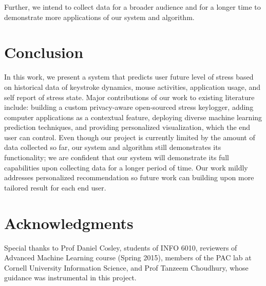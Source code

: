 \documentclass{article}
\begin{document}
Further, we intend to collect data for a broader audience and for a longer time to demonstrate more applications of our system and algorithm. 

\section{Conclusion}
In this work, we present a system that predicts user future level of stress based on historical data of keystroke dynamics, mouse activities, application usage, and self report of stress state. Major contributions of our work to existing literature include: building a custom privacy-aware open-sourced stress keylogger, adding computer applications as a contextual feature, deploying diverse machine learning prediction techniques, and providing personalized visualization, which the end user can control. Even though our project is currently limited by the amount of data collected so far, our system and algorithm still demonstrates its functionality; we are confident that our system will demonstrate its full capabilities upon collecting data for a longer period of time. Our work mildly addresses personalized recommendation so future work can building upon more tailored result for each end user. 
\section*{Acknowledgments} 
Special thanks to Prof Daniel Cosley, students of INFO 6010, reviewers of Advanced Machine Learning course (Spring 2015), members of the PAC lab at Cornell University Information Science, and Prof Tanzeem Choudhury, whose guidance was instrumental in this project. 




\end{document}
